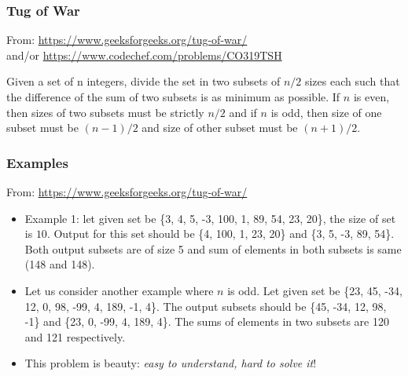 \documentclass{beamer}
\begin{document}
\begin{frame}[fragile] 

	\frametitle{Tug of War} 

From: \url{https://www.geeksforgeeks.org/tug-of-war/}\\
and/or \url{https://www.codechef.com/problems/CO319TSH}

\begin{block}{}

Given a set of n integers, divide the set in two subsets of $n/2$ sizes each such that the difference of the sum of two subsets is as minimum as possible. If $n$ is even, then sizes of two subsets must be strictly $n/2$ and if $n$ is odd, then size of one subset must be $(n-1)/2$ and size of other subset must be $(n+1)/2$.
\end{block}

\end{frame}


\begin{frame}[fragile] 

	\frametitle{Examples} 

From: \url{https://www.geeksforgeeks.org/tug-of-war/}

\begin{block}{}
  \begin{itemize}
  \setlength\itemsep{7pt}

  \item Example 1: let given set be \{3, 4, 5, -3, 100, 1, 89, 54, 23, 20\}, the size of set is $10$. Output for this set should be \{4, 100, 1, 23, 20\} and \{3, 5, -3, 89, 54\}. Both output subsets are of size 5 and sum of elements in both subsets is same (148 and 148). 

  \item Let us consider another example where $n$ is odd. Let given set be \{23, 45, -34, 12, 0, 98, -99, 4, 189, -1, 4\}. The output subsets should be \{45, -34, 12, 98, -1\} and \{23, 0, -99, 4, 189, 4\}. The sums of elements in two subsets are 120 and 121 respectively.


\item This problem is beauty: \emph{easy to understand, hard to solve it}!

  \end{itemize}
 \end{block}

\end{frame}
\end{document}
